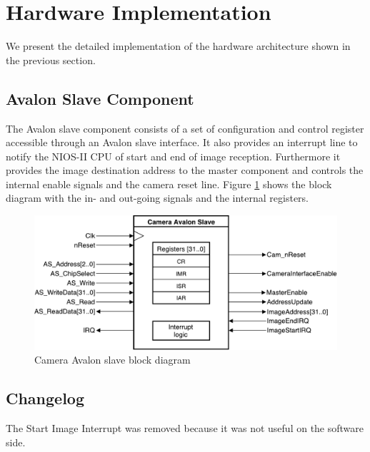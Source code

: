 \documentclass{article}
\begin{document}
\section{Hardware Implementation}

We present the detailed implementation of the hardware architecture shown in the previous section. 

\subsection{Avalon Slave Component}

The Avalon slave component consists of a set of configuration and control register accessible through an Avalon slave interface.
It also provides an interrupt line to notify the NIOS-II CPU of start and end of image reception. Furthermore it provides the image destination address to the master component and controls the internal enable signals and the camera reset line.
Figure \ref{fig:avalon_slave} shows the block diagram with the in- and out-going signals and the internal registers.

\begin{figure}[H]
\centering
\includegraphics[width=\textwidth]{images/CameraAvalonSlave.pdf}
\caption{Camera Avalon slave block diagram}
\label{fig:avalon_slave}
\end{figure}

\subsection{Changelog}
The Start Image Interrupt was removed because it was not useful on the software side.
\end{document}

